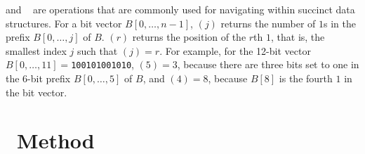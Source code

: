 
 and ~\cite{Jacobson89} are operations that are commonly
used for navigating within succinct data structures. For a bit vector
$B[0,\ldots,n-1]$, \rank$(j)$ returns the number of $1$s in the prefix
$B[0,\ldots,j]$ of $B$. \select$(r)$ returns the position of the $r$th $1$, that
is, the smallest index $j$ such that \rank$(j)=r$. For example, for the 12-bit
vector $B[0,\ldots,11]=$\texttt{100101001010}, \rank$(5)=3$, because there are
three bits set to one in the 6-bit prefix $B[0,\ldots,5]$ of $B$, and
\select$(4)=8$, because $B[8]$ is the fourth $1$ in the bit vector.

\section{~Method}
\label{method}

